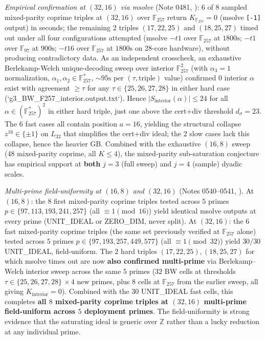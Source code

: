 \documentclass[11pt]{article}
\theoremstyle{definition}
\theoremstyle{remark}
\newcommand{\FF}{\mathbb{F}}
\begin{document}
\emph{Empirical confirmation at $(32, 16)$ via msolve} (Note 0481,
\cite{CompanionRepo}): 6 of 8 sampled mixed-parity coprime triples
at $(32, 16)$ over $\FF_{257}$ return $K_{\FF_{257}} = 0$ (msolve
\texttt{[-1]} output) in seconds; the remaining 2 triples
$(17, 22, 25)$ and $(18, 25, 27)$ timed out under all four
configurations attempted (msolve $-t 1$ over $\FF_{257}$ at $1800\mathrm{s}$;
$-t 1$ over $\FF_{97}$ at $900\mathrm{s}$; $-t 16$ over $\FF_{257}$ at
$1800\mathrm{s}$ on 28-core hardware), without producing contradictory
data. As an independent crosscheck, an exhaustive Berlekamp-Welch
unique-decoding sweep over interior $\FF_{257}^2$ (with $\alpha_3 = 1$
normalization, $\alpha_1, \alpha_2 \in \FF_{257}^\ast$, $\sim 95\mathrm{s}$
per $(\tau, \mathrm{triple})$ value) confirmed $0$ interior $\alpha$
exist with agreement $\geq \tau$ for any $\tau \in \{25, 26, 27, 28\}$
in either hard case
(`g3_BW_F257_interior.output.txt`). Hence
$|S_{\text{interior}}(\alpha)| \leq 24$ for all $\alpha \in (\FF_{257}^\ast)^2$
in either hard triple, just one above the cert+div threshold
$d_\sigma = 23$. The 6 fast cases all contain
position $a = 16$,
yielding the structural collapse $z^{16} \in \{\pm 1\}$ on $L_{32}$
that simplifies the cert+div ideal; the 2 slow cases lack this
collapse, hence the heavier GB. Combined with the exhaustive
$(16, 8)$ sweep (48 mixed-parity coprime, all $K \leq 4$), the
mixed-parity sub-saturation conjecture has empirical support at
\textbf{both} $j = 3$ (full sweep) and $j = 4$ (sample) dyadic scales.

\emph{Multi-prime field-uniformity at $(16, 8)$ and $(32, 16)$}
(Notes 0540--0541, \cite{CompanionRepo}). At $(16, 8)$: the $8$ first
mixed-parity coprime triples tested across $5$ primes
$p \in \{97, 113, 193, 241, 257\}$ (all $\equiv 1 \pmod{16}$) yield
identical msolve outputs at every prime (UNIT\_IDEAL or ZERO\_DIM,
never split). At $(32, 16)$: the $6$ fast mixed-parity coprime
triples (the same set previously verified at $\FF_{257}$ alone)
tested across $5$ primes $p \in \{97, 193, 257, 449, 577\}$ (all
$\equiv 1 \pmod{32}$) yield $30/30$ UNIT\_IDEAL, field-uniform.
The $2$ hard triples $(17, 22, 25), (18, 25, 27)$ for which msolve
times out are now \textbf{also confirmed multi-prime} via
Berlekamp--Welch interior sweep across the same $5$ primes
($32$ BW cells at thresholds $\tau \in \{25, 26, 27, 28\}$ ${\times}\,4$
new primes, plus $8$ cells at $\FF_{257}$ from the earlier sweep,
all giving $K_\mathrm{interior} = 0$). Combined with the $30$
UNIT\_IDEAL fast cells, this completes \textbf{all $8$ mixed-parity
coprime triples at $(32, 16)$ multi-prime field-uniform across $5$
deployment primes}. The field-uniformity is strong evidence that the
saturating ideal is generic over $\mathbb{Z}$ rather than a lucky
reduction at any individual prime.
\end{document}
